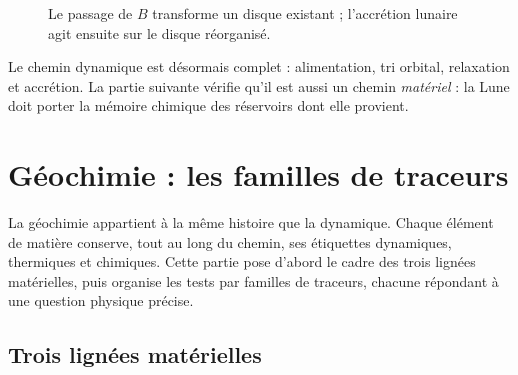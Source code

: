 \documentclass[11pt,a4paper,openany]{report}
\begin{document}
\begin{figure}[htbp]
\centering
{}
\caption{Le passage de $B$ transforme un disque existant ; l'accrétion lunaire agit ensuite sur le
disque réorganisé.}
\label{fig:flux}
\end{figure}


\begin{rappel}
Le chemin dynamique est désormais complet : alimentation, tri orbital, relaxation et accrétion. La
partie suivante vérifie qu'il est aussi un chemin \emph{matériel} : la Lune doit porter la mémoire
chimique des réservoirs dont elle provient.
\end{rappel}

\part{Géochimie : les familles de traceurs}
\label{part:geochimie}

\noindent
La géochimie appartient à la même histoire que la dynamique. Chaque élément de matière
conserve, tout au long du chemin, ses étiquettes dynamiques, thermiques et chimiques. Cette
partie pose d'abord le cadre des trois lignées matérielles, puis organise les tests par familles de
traceurs, chacune répondant à une question physique précise.

\chapter{Trois lignées matérielles}
\label{sec:geochimie}
\end{document}
